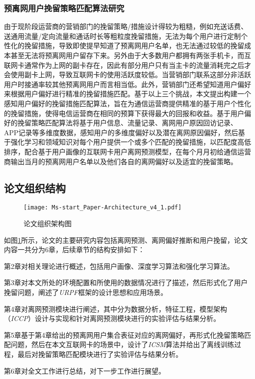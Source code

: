 \subsubsection{预离网用户挽留策略匹配算法研究}
由于现阶段运营商的营销部门的挽留策略/措施设计得较为粗糙，例如充送话费、送通用流量/定向流量和通话时长等粗粒度挽留措施，无法为每个用户进行定制个性化的挽留措施，导致即使提早知道了预离网用户名单，也无法通过较低的挽留成本甚至无法将预离网用户留存下来。另外由于大多数用户都拥有两张手机卡，而互联网卡通常作为上网的副卡存在，因此有部分用户只有当主卡的流量消耗完之后才会使用副卡上网，导致互联网卡的使用活跃度较低。当营销部门联系这部分非活跃用户时接通率较其他预离网用户而言相当低。此外，营销部门还希望知道用户偏好来根据用户偏好进行精准的挽留措施匹配。基于以上三个挑战，本文提出构建一个感知用户偏好的挽留措施匹配算法，旨在为通信运营商提供精准的基于用户个性化的挽留措施，使得电信运营商在相同的预算下获得最大的回报和收益。基于用户偏好的挽留策略匹配算法将基于用户信息、流量记录、离网用户原因回访记录、APP记录等多维度数据，感知用户的多维度偏好以及潜在离网原因偏好，然后基于强化学习和领域知识对每个用户提供一个或多个匹配的挽留措施，以匹配度高低排序，配合基于用户画像的互联网卡用户离网预测模型，在每个月月初给通信运营商输出当月的预离网用户名单以及他们各自的离网偏好以及适宜的挽留策略。

\subsection{论文组织结构}

\begin{figure}[hbt]
	\centering
	\texttt{[image: Ms-start\_Paper-Architecture\_v4\_1.pdf]}
	\caption{论文组织架构图}
	\label{Fig:Paper-Architecture}
\end{figure}
如图\ref{Fig:Paper-Architecture}所示，论文的主要研究内容包括离网预测、离网偏好推断和用户挽留，论文内容一共分为6章，后续章节的结构安排如下：\par
第2章对相关理论进行概述，包括用户画像、深度学习算法和强化学习算法。\par
第3章对本文所处的环境配置和所使用的数据情况进行了描述，然后形式化了用户挽留问题，阐述了\emph{URPF}框架的设计思想和应用场景。\par
第4章对离网预测模块进行阐述，其中分为数据分析，特征工程，模型架构（\emph{ICCP}）设计与实现和针对离网预测模块进行的实验评估与结果分析。\par
第5章基于第4章给出的预离网用户集合表征对应的离网偏好，再形式化挽留策略匹配问题，然后在本文互联网卡的场景中，设计了\emph{ICSM}算法并给出了离线训练过程，最后对挽留策略匹配模块进行了实验评估与结果分析。\par
第6章对全文工作进行总结，对下一步工作进行展望。
\newpage

